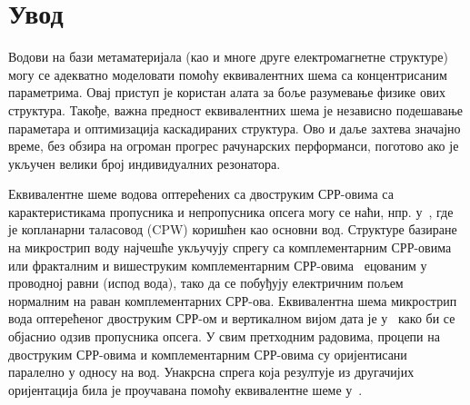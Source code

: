 \documentclass[main.tex]{subfiles}
\begin{document}
\section{Увод}

Водови на бази метаматеријала (као и многе друге електромагнетне структуре) могу се адекватно моделовати помоћу еквивалентних шема са концентрисаним параметрима. Овај приступ је користан алата за боље разумевање физике ових структура. Такође, важна предност еквивалентних шема је независно подешавање параметара и оптимизација каскадираних структура. Ово и даље захтева значајно време, без обзира на огроман прогрес рачунарских перформанси, поготово ако је укључен велики број индивидуалних резонатора.

Еквивалентне шеме водова оптерећених са двоструким СРР-овима са карактеристикама пропусника и непропусника опсега могу се наћи, нпр. у~\cite{baena,aznar_improved}, где је копланарни таласовод (CPW) коришћен као основни вод. Структуре базиране на микрострип воду најчешће укључују спрегу са комплементарним СРР-овима~\cite{bib14} или фракталним и вишеструким комплементарним СРР-овима~\cite{bib15} ецованим у проводној равни (испод вода), тако да се побуђују електричним пољем нормалним на раван комплементарних СРР-ова. Еквивалентна шема микрострип вода оптерећеног двоструким СРР-ом и вертикалном вијом дата је у~\cite{bib16} како би се објаснио одзив пропусника опсега. У свим претходним радовима, процепи на двоструким СРР-овима и комплементарним СРР-овима су оријентисани паралелно у односу на вод. Унакрсна спрега која резултује из другачијих оријентација била је проучавана помоћу еквивалентне шеме у~\cite{naqui:13}.
\end{document}
